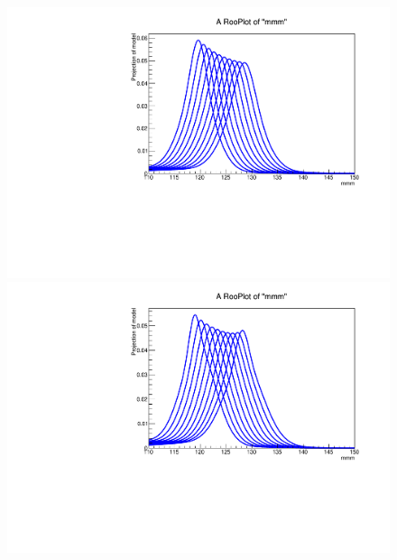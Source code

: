 \begin{figure}[hbp]
  \includegraphics[width=0.49\linewidth]{figures/signal_model/AppendixBdt/interpolation_GluGlu_cat2.pdf}
  \includegraphics[width=0.49\linewidth]{figures/signal_model/AppendixBdt/interpolation_VBF_cat2.pdf}
  \caption{}
  \label{fig:higgs_signalmodel_gluvbfc0c2}
\end{figure}

